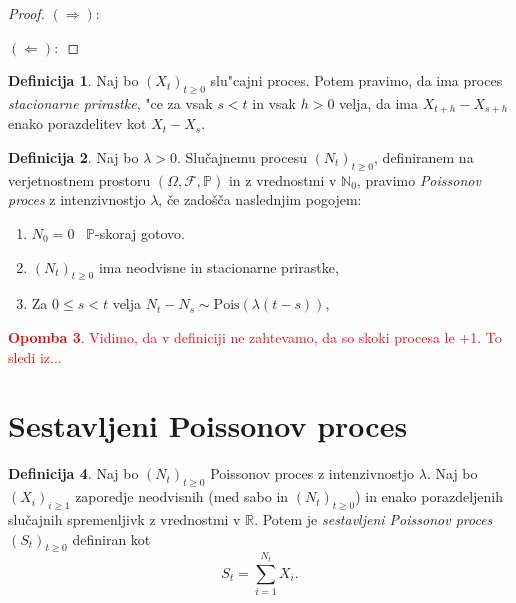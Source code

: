 \documentclass[12pt, a4paper, reqno]{amsart}
\theoremstyle{definition} %
\newtheorem{definicija}{Definicija}[section]
\newtheorem{opomba}[definicija]{Opomba}
\theoremstyle{plain} %
\newcommand{\N}{\mathbb{N}}
\newcommand{\Prob}{\mathbb{P}}
\newcommand{\1}{\mathds{1}}
\newcommand{\Pois}[1]{\text{Pois}(#1)}
\begin{document}
    \begin{proof}
        $(\Rightarrow):$

        $(\Leftarrow):$
    \end{proof}

    \begin{definicija}
        Naj bo $(X_t)_{t\geq0}$ slu"cajni proces. Potem pravimo, da ima proces
        \textit{stacionarne prirastke}, "ce za vsak $s < t$ in vsak $h > 0$ velja, 
        da ima $X_{t+h} - X_{s+h}$ enako porazdelitev kot $X_t - X_s$.
        \label{def:stacPrir}
    \end{definicija}

    \begin{definicija}
        Naj bo $\lambda > 0$. Slučajnemu procesu $(N_t)_{t\geq 0}$, definiranem na verjetnostnem 
        prostoru $(\Omega, \mathcal{F}, \mathbb{P})$ in z vrednostmi v $\N_0$, pravimo 
        \textit{Poissonov proces} z intenzivnostjo $\lambda$, če zadošča naslednjim pogojem:
        \begin{enumerate}
            \item $N_0 = 0$ \ $\Prob$-skoraj gotovo.
            \item $(N_t)_{t\geq 0}$ ima neodvisne in stacionarne prirastke,
            \item Za $0 \leq s < t$ velja $ N_t - N_s \sim\Pois{\lambda(t - s)}$,
        \end{enumerate}
        \label{def:HPP}
    \end{definicija}
\textcolor{red}{
    \begin{opomba}
        Vidimo, da v definiciji ne zahtevamo, da so skoki procesa le +1. To sledi iz...
        \label{op:skoki}
    \end{opomba}
}

\section{Sestavljeni Poissonov proces}

    \begin{center}
    \end{center}
    \begin{definicija}
        Naj bo $(N_t)_{t\geq0}$ Poissonov proces z intenzivnostjo $\lambda$. 
        Naj bo $(X_i)_{i\geq1}$ zaporedje neodvisnih (med sabo in $(N_t)_{t\geq0}$) in enako 
        porazdeljenih slučajnih spremenljivk z vrednostmi v $\mathbb{R}$. Potem je 
        \textit{sestavljeni Poissonov proces} $(S_t)_{t\geq0}$ definiran kot
        $$
            S_t = \sum_{i=1}^{N_t} X_i.
        $$
        \label{def:CPP}
    \end{definicija}
\end{document}
